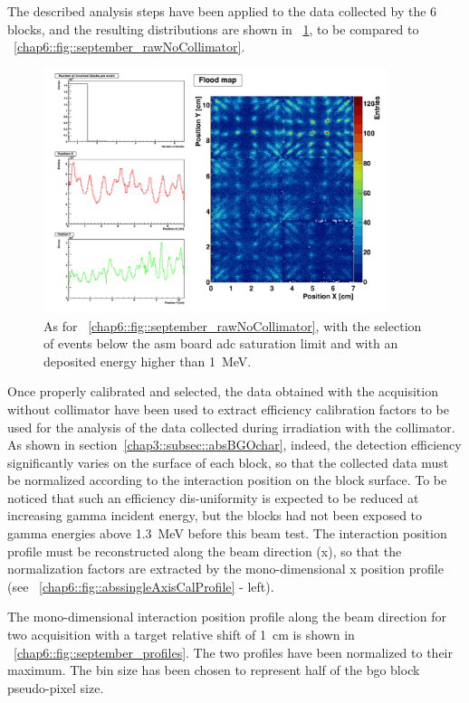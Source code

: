 The described analysis steps have been applied to the data collected by the 6 blocks, and the resulting distributions are shown in \figurename~\ref{chap6::fig::september_selNoCollimator}, to be compared to \figurename~\ref{chap6::fig::september_rawNoCollimator}.
\begin{figure}[!htbp]
\centering
\includegraphics[width=0.9\textwidth]{03_GraphicFiles/chapter6_BeamTests/Nice_September2018/287_complete_cutAppl.png}
\caption{As for \figurename~\ref{chap6::fig::september_rawNoCollimator}, with the selection of events below the \gls{asm} board \gls{adc} saturation limit and with an deposited energy higher than 1~MeV.}
\label{chap6::fig::september_selNoCollimator}
\end{figure}

Once properly calibrated and selected, the data obtained with the acquisition without collimator have been used to extract efficiency calibration factors to be used for the analysis of the data collected during irradiation with the collimator. As shown in section~\ref{chap3::subsec::absBGOchar}, indeed, the detection efficiency significantly varies on the surface of each block, so that the collected data must be normalized according to the interaction position on the block surface. To be noticed that such an efficiency dis-uniformity is expected to be reduced at increasing gamma incident energy, but the blocks had not been exposed to gamma energies above 1.3~MeV before this beam test. The interaction position profile must be reconstructed along the beam direction (x), so that the normalization factors are extracted by the mono-dimensional x position profile (see \figurename~\ref{chap6::fig::abssingleAxisCalProfile} - left). 

The mono-dimensional interaction position profile along the beam direction for two acquisition with a target relative shift of 1~cm is shown in \figurename~\ref{chap6::fig::september_profiles}. The two profiles have been normalized to their maximum. The bin size has been chosen to represent half of the \gls{bgo} block pseudo-pixel size.

